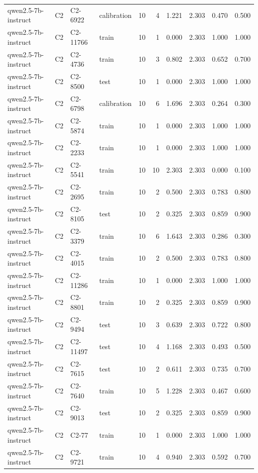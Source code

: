 \begin{table}
\begin{tabular}{llllrrrrrr}
qwen2.5-7b-instruct & C2 & C2-6922 & calibration & 10 & 4 & 1.221 & 2.303 & 0.470 & 0.500 \\
qwen2.5-7b-instruct & C2 & C2-11766 & train & 10 & 1 & 0.000 & 2.303 & 1.000 & 1.000 \\
qwen2.5-7b-instruct & C2 & C2-4736 & train & 10 & 3 & 0.802 & 2.303 & 0.652 & 0.700 \\
qwen2.5-7b-instruct & C2 & C2-8500 & test & 10 & 1 & 0.000 & 2.303 & 1.000 & 1.000 \\
qwen2.5-7b-instruct & C2 & C2-6798 & calibration & 10 & 6 & 1.696 & 2.303 & 0.264 & 0.300 \\
qwen2.5-7b-instruct & C2 & C2-5874 & train & 10 & 1 & 0.000 & 2.303 & 1.000 & 1.000 \\
qwen2.5-7b-instruct & C2 & C2-2233 & train & 10 & 1 & 0.000 & 2.303 & 1.000 & 1.000 \\
qwen2.5-7b-instruct & C2 & C2-5541 & train & 10 & 10 & 2.303 & 2.303 & 0.000 & 0.100 \\
qwen2.5-7b-instruct & C2 & C2-2695 & train & 10 & 2 & 0.500 & 2.303 & 0.783 & 0.800 \\
qwen2.5-7b-instruct & C2 & C2-8105 & test & 10 & 2 & 0.325 & 2.303 & 0.859 & 0.900 \\
qwen2.5-7b-instruct & C2 & C2-3379 & train & 10 & 6 & 1.643 & 2.303 & 0.286 & 0.300 \\
qwen2.5-7b-instruct & C2 & C2-4015 & train & 10 & 2 & 0.500 & 2.303 & 0.783 & 0.800 \\
qwen2.5-7b-instruct & C2 & C2-11286 & train & 10 & 1 & 0.000 & 2.303 & 1.000 & 1.000 \\
qwen2.5-7b-instruct & C2 & C2-8801 & train & 10 & 2 & 0.325 & 2.303 & 0.859 & 0.900 \\
qwen2.5-7b-instruct & C2 & C2-9494 & test & 10 & 3 & 0.639 & 2.303 & 0.722 & 0.800 \\
qwen2.5-7b-instruct & C2 & C2-11497 & test & 10 & 4 & 1.168 & 2.303 & 0.493 & 0.500 \\
qwen2.5-7b-instruct & C2 & C2-7615 & test & 10 & 2 & 0.611 & 2.303 & 0.735 & 0.700 \\
qwen2.5-7b-instruct & C2 & C2-7640 & train & 10 & 5 & 1.228 & 2.303 & 0.467 & 0.600 \\
qwen2.5-7b-instruct & C2 & C2-9013 & test & 10 & 2 & 0.325 & 2.303 & 0.859 & 0.900 \\
qwen2.5-7b-instruct & C2 & C2-77 & train & 10 & 1 & 0.000 & 2.303 & 1.000 & 1.000 \\
qwen2.5-7b-instruct & C2 & C2-9721 & train & 10 & 4 & 0.940 & 2.303 & 0.592 & 0.700 \\

\end{tabular}
\end{table}
